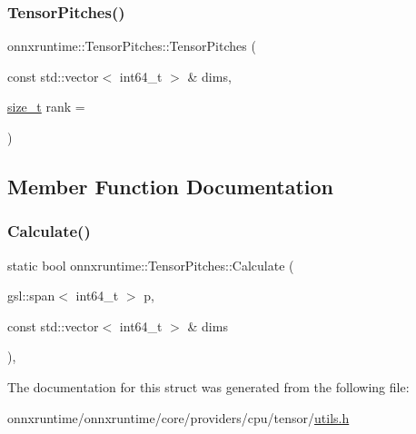 \subsubsection{\texorpdfstring{Tensor\+Pitches()}{TensorPitches()}\hspace{0.1cm}{\footnotesize\ttfamily [3/3]}}
{\footnotesize\ttfamily onnxruntime\+::\+Tensor\+Pitches\+::\+Tensor\+Pitches (\begin{DoxyParamCaption}\item[{const std\+::vector$<$ int64\+\_\+t $>$ \&}]{dims,  }\item[{\mbox{\hyperlink{mlasi_8h_a503efbc1c6e50825320ad909366b78ab}{size\+\_\+t}}}]{rank = {} }\end{DoxyParamCaption})\hspace{0.3cm}{\ttfamily [inline]}}



\subsection{Member Function Documentation}
\mbox{\label{structonnxruntime_1_1TensorPitches_a406e89348dd83badf0483bfd9df832a7}} 
\subsubsection{\texorpdfstring{Calculate()}{Calculate()}}
{\footnotesize\ttfamily static bool onnxruntime\+::\+Tensor\+Pitches\+::\+Calculate (\begin{DoxyParamCaption}\item[{gsl\+::span$<$ int64\+\_\+t $>$}]{p,  }\item[{const std\+::vector$<$ int64\+\_\+t $>$ \&}]{dims }\end{DoxyParamCaption})\hspace{0.3cm}{\ttfamily [inline]}, {\ttfamily [static]}}



The documentation for this struct was generated from the following file\+:\begin{DoxyCompactItemize}
\item 
onnxruntime/onnxruntime/core/providers/cpu/tensor/\mbox{\hyperlink{providers_2cpu_2tensor_2utils_8h}{utils.\+h}}\end{DoxyCompactItemize}

